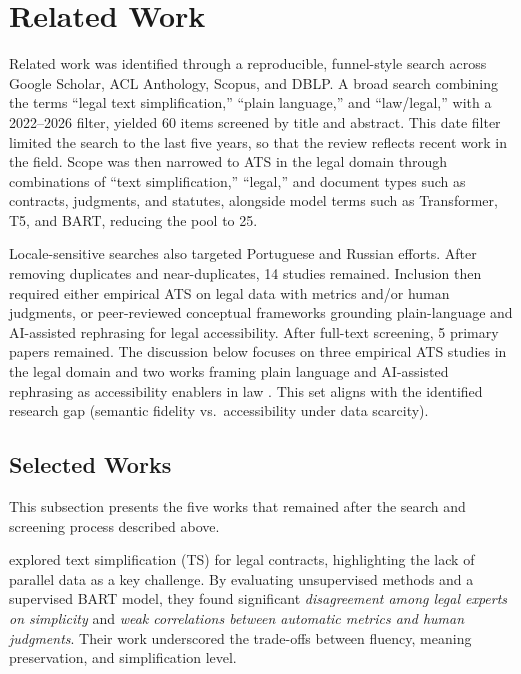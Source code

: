 \documentclass[english]{UNISINOSartigo} %
\begin{document}
\section{Related Work}

Related work was identified through a reproducible, funnel-style search across Google Scholar, ACL Anthology, Scopus, and DBLP. A broad search combining the terms ``legal text simplification,'' ``plain language,'' and ``law/legal,'' with a 2022--2026 filter, yielded 60 items screened by title and abstract. This date filter limited the search to the last five years, so that the review reflects recent work in the field. Scope was then narrowed to ATS in the legal domain through combinations of ``text simplification,'' ``legal,'' and document types such as contracts, judgments, and statutes, alongside model terms such as Transformer, T5, and BART, reducing the pool to 25.

Locale-sensitive searches also targeted Portuguese and Russian efforts. After removing duplicates and near-duplicates, 14 studies remained. Inclusion then required either empirical ATS on legal data with metrics and/or human judgments, or peer-reviewed conceptual frameworks grounding plain-language and AI-assisted rephrasing for legal accessibility. After full-text screening, 5 primary papers remained. The discussion below focuses on three empirical ATS studies in the legal domain \cite{garimella2022insights,alves2023automatic,athugodage2024transfer} and two works framing plain language and AI-assisted rephrasing as accessibility enablers in law \cite{toivonen2025jelt,zimina2025gai}. This set aligns with the identified research gap (semantic fidelity vs.\ accessibility under data scarcity).

\subsection{Selected Works}

This subsection presents the five works that remained after the search and screening process described above.

 explored text simplification (TS) for legal contracts, highlighting the lack of parallel data as a key challenge. By evaluating unsupervised methods and a supervised BART model, they found significant \textit{disagreement among legal experts on simplicity} and \textit{weak correlations between automatic metrics and human judgments}. Their work underscored the trade-offs between fluency, meaning preservation, and simplification level.
\end{document}
